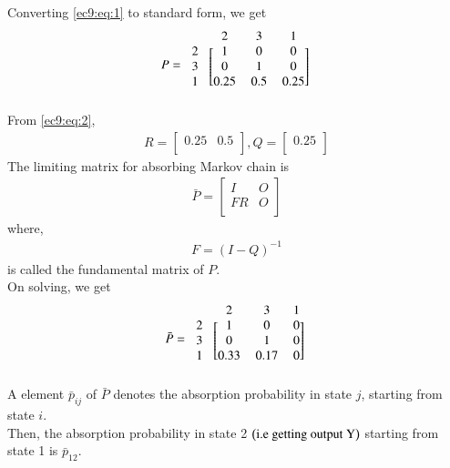 Converting \eqref{ec9:eq:1} to standard form, we get
\begin{align}
P=\begin{blockarray}{cccccc}
&2 & 3 & 1  \\
\begin{block}{c[ccccc]}
  2 & 1 & 0 & 0  \\
  3 & 0 & 1 & 0 \\
  1 & 0.25 & 0.5 & 0.25  \\
\end{block}
\end{blockarray}
\end{align}
From \eqref{ec9:eq:2},
\begin{align}
\tag{104.5}
\label{ec9:eq:r,q}
    R=\begin{bmatrix}
    0.25 & 0.5\\
    \end{bmatrix},
    Q=\begin{bmatrix}
    0.25\\
    \end{bmatrix}
\end{align}
The limiting matrix for absorbing Markov chain is
\begin{align}
\bar P=\begin{bmatrix}
    I & O\\
    FR & O\\
    \end{bmatrix}
\end{align}
where,
\begin{align}
F=(I-Q)^{-1}
\end{align}
is called the fundamental matrix of $P$. \\
On solving, we get
\begin{align}
\bar P=\begin{blockarray}{cccccc}
&2 & 3 & 1 \\
\begin{block}{c[ccccc]}
    2 & 1 & 0 & 0\\ 
    3 & 0 & 1 & 0\\ 
    1 & 0.33 & 0.17 & 0\\    
\end{block}
\end{blockarray}
\end{align}
A element $\bar p_{ij}$ of $\bar P$ denotes the absorption probability in state $j$, starting from state $i$. 
\\ Then, the absorption probability in state 2 $\left(\text{i.e getting output Y}\right)$ starting from state 1 is $\bar p_{12}$.
